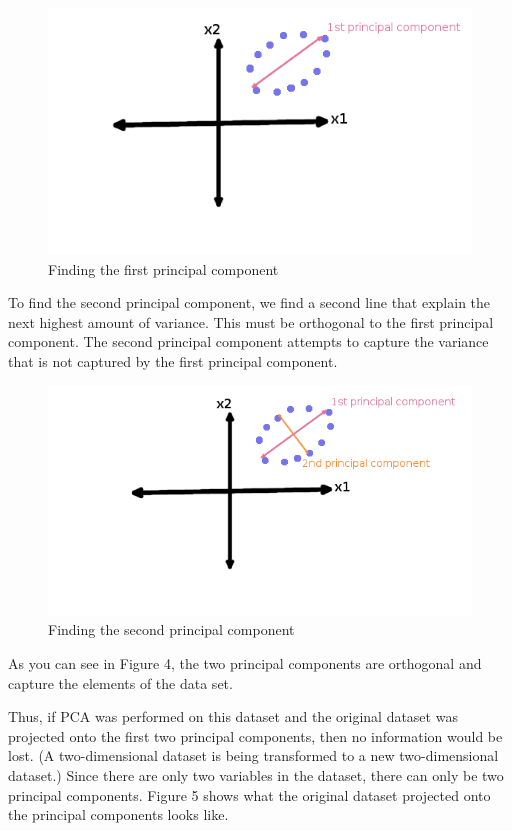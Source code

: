 \documentclass[12pt,twoside]{reedthesis}
\begin{document}
  \begin{figure}[htbp]
  \centering
  \includegraphics{figure/PrincipalComponent1.png}
  \caption{Finding the first principal component}
  \end{figure}
  
  \newpage
  
  To find the second principal component, we find a second line that
  explain the next highest amount of variance. This must be orthogonal to
  the first principal component. The second principal component attempts
  to capture the variance that is not captured by the first principal
  component.
  
  \begin{figure}[htbp]
  \centering
  \includegraphics{figure/PrincipalComponent2.png}
  \caption{Finding the second principal component}
  \end{figure}
  
  As you can see in Figure 4, the two principal components are orthogonal
  and capture the elements of the data set.
  
  \newpage
  
  Thus, if PCA was performed on this dataset and the original dataset was
  projected onto the first two principal components, then no information
  would be lost. (A two-dimensional dataset is being transformed to a new
  two-dimensional dataset.) Since there are only two variables in the
  dataset, there can only be two principal components. Figure 5 shows what
  the original dataset projected onto the principal components looks like.
  
\end{document}
